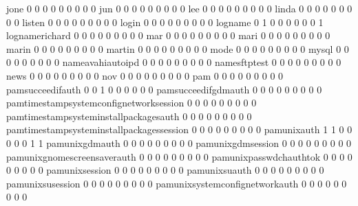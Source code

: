\documentclass[compress,8pt]{beamer}
\begin{document}
\begin{frame}
\begin{Schunk}
  jone                                       0   0   0   0   0   0   0   0   0
  jun                                        0   0   0   0   0   0   0   0   0
  lee                                        0   0   0   0   0   0   0   0   0
  linda                                      0   0   0   0   0   0   0   0   0
  listen                                     0   0   0   0   0   0   0   0   0
  login                                      0   0   0   0   0   0   0   0   0
  logname                                    0   1   0   0   0   0   0   0   1
  lognamerichard                             0   0   0   0   0   0   0   0   0
  mar                                        0   0   0   0   0   0   0   0   0
  mari                                       0   0   0   0   0   0   0   0   0
  marin                                      0   0   0   0   0   0   0   0   0
  martin                                     0   0   0   0   0   0   0   0   0
  mode                                       0   0   0   0   0   0   0   0   0
  mysql                                      0   0   0   0   0   0   0   0   0
  nameavahiautoipd                           0   0   0   0   0   0   0   0   0
  namesftptest                               0   0   0   0   0   0   0   0   0
  news                                       0   0   0   0   0   0   0   0   0
  nov                                        0   0   0   0   0   0   0   0   0
  pam                                        0   0   0   0   0   0   0   0   0
  pamsucceedifauth                           0   0   1   0   0   0   0   0   0
  pamsucceedifgdmauth                        0   0   0   0   0   0   0   0   0
  pamtimestampsystemconfignetworksession     0   0   0   0   0   0   0   0   0
  pamtimestampsysteminstallpackagesauth      0   0   0   0   0   0   0   0   0
  pamtimestampsysteminstallpackagessession   0   0   0   0   0   0   0   0   0
  pamunixauth                                1   1   0   0   0   0   0   1   1
  pamunixgdmauth                             0   0   0   0   0   0   0   0   0
  pamunixgdmsession                          0   0   0   0   0   0   0   0   0
  pamunixgnomescreensaverauth                0   0   0   0   0   0   0   0   0
  pamunixpasswdchauthtok                     0   0   0   0   0   0   0   0   0
  pamunixsession                             0   0   0   0   0   0   0   0   0
  pamunixsuauth                              0   0   0   0   0   0   0   0   0
  pamunixsusession                           0   0   0   0   0   0   0   0   0
  pamunixsystemconfignetworkauth             0   0   0   0   0   0   0   0   0

\end{Schunk}
\end{frame}
\end{document}
